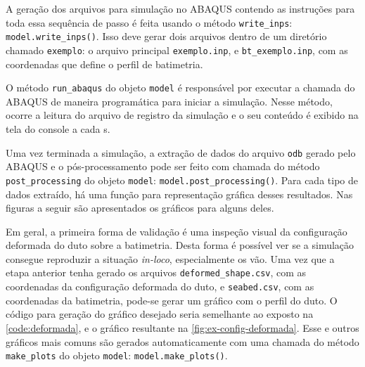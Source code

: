 
A geração dos arquivos para simulação no ABAQUS contendo as instruções para toda essa sequência de passo é feita usando o método \texttt{write\_inps}: \texttt{model.write\_inps()}.
Isso deve gerar dois arquivos dentro de um diretório chamado \texttt{exemplo}: o arquivo principal \texttt{exemplo.inp}, e \texttt{bt\_exemplo.inp}, com as coordenadas que define o perfil de batimetria. \par

O método \texttt{run\_abaqus} do objeto \texttt{model} é responsável por executar a chamada do ABAQUS de maneira programática para iniciar a simulação.
Nesse método, ocorre a leitura do arquivo de registro da simulação e o seu conteúdo é exibido na tela do console a cada \unit[5]{s}. %

Uma vez terminada a simulação, a extração de dados do arquivo \texttt{odb} gerado pelo ABAQUS e o pós-processamento pode ser feito com chamada do método \texttt{post\_processing} do objeto \texttt{model}: \texttt{model.post\_processing()}.
Para cada tipo de dados extraído, há uma função para representação gráfica desses resultados. Nas figuras a seguir são apresentados os gráficos para alguns deles.

Em geral, a primeira forma de validação é uma inspeção visual da configuração deformada do duto sobre a batimetria. Desta forma é possível ver se a simulação consegue reproduzir a situação \textit{in-loco}, especialmente os vão. Uma vez que a etapa anterior tenha gerado os arquivos \texttt{deformed\_shape.csv}, com as coordenadas da configuração deformada do duto, e \texttt{seabed.csv}, com as coordenadas da batimetria, pode-se gerar um gráfico com o perfil do duto. O código para geração do gráfico desejado seria semelhante ao exposto na \autoref{code:deformada}, e o gráfico resultante na \autoref{fig:ex-config-deformada}. Esse e outros gráficos mais comuns são gerados automaticamente com uma chamada do método \texttt{make\_plots} do objeto \texttt{model}: \texttt{model.make\_plots()}.

